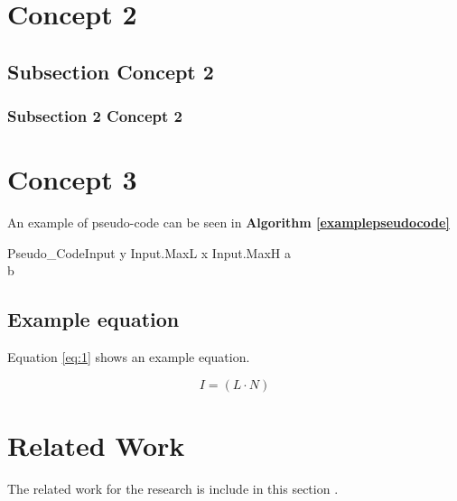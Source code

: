 \section{Concept 2}

\label{section:Concept2}

\subsection{Subsection Concept 2}

\subsubsection{Subsection 2 Concept 2}

\section{Concept 3}
An example of pseudo-code can be seen in \textbf{Algorithm \ref{examplepseudocode}}

\begin{pseudocode}{Pseudo\_Code}{Input} \label{examplepseudocode}
	\FOR y  \TO Input.MaxL \DO
	\BEGIN
	\FOR x  \TO Input.MaxH \DO
	\BEGIN
	a \GETS {}\\
	b \GETS {}\\
	\END
	\END
\end{pseudocode}


\subsection{Example equation}
 Equation \ref{eq:1} shows an example equation.

\[
I=(L\cdot N) \tag{1} \label{eq:1}
\]
  
\section{Related Work}
The related work for the research is include in this section \cite{examplereference}.
